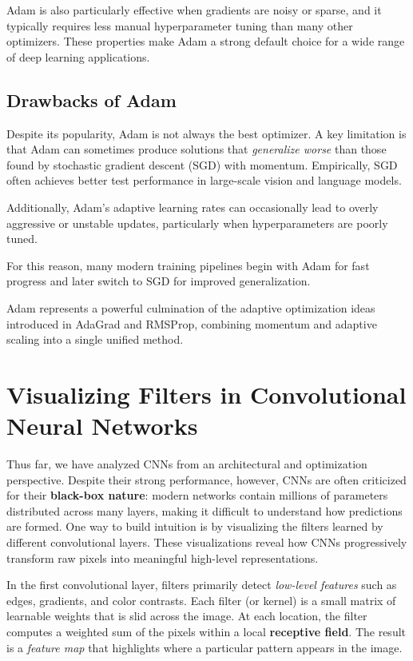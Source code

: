 \documentclass{article}
\begin{document}
Adam is also particularly effective when gradients are noisy or sparse, and it typically requires less manual hyperparameter tuning than many other optimizers. These properties make Adam a strong default choice for a wide range of deep learning applications.

\subsection{Drawbacks of Adam}

Despite its popularity, Adam is not always the best optimizer. A key limitation is that Adam can sometimes produce solutions that \textit{generalize worse} than those found by stochastic gradient descent (SGD) with momentum. Empirically, SGD often achieves better test performance in large-scale vision and language models.

Additionally, Adam’s adaptive learning rates can occasionally lead to overly aggressive or unstable updates, particularly when hyperparameters are poorly tuned.

For this reason, many modern training pipelines begin with Adam for fast progress and later switch to SGD for improved generalization.

\medskip

Adam represents a powerful culmination of the adaptive optimization ideas introduced in AdaGrad and RMSProp, combining momentum and adaptive scaling into a single unified method.
\section{Visualizing Filters in Convolutional Neural Networks}

Thus far, we have analyzed CNNs from an architectural and optimization perspective. Despite their strong performance, however, CNNs are often criticized for their \textbf{black-box nature}: modern networks contain millions of parameters distributed across many layers, making it difficult to understand how predictions are formed. One way to build intuition is by visualizing the filters learned by different convolutional layers. These visualizations reveal how CNNs progressively transform raw pixels into meaningful high-level representations.

\medskip

In the first convolutional layer, filters primarily detect \emph{low-level features} such as edges, gradients, and color contrasts. Each filter (or kernel) is a small matrix of learnable weights that is slid across the image. At each location, the filter computes a weighted sum of the pixels within a local \textbf{receptive field}. The result is a \emph{feature map} that highlights where a particular pattern appears in the image.
\end{document}
